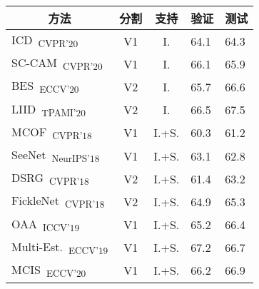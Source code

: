 \begin{table}[]
\normalsize
\centering
{\small
\begin{tabular}{@{}lccll@{}}
\toprule
\multicolumn{1}{c}{方法}                                                              & 分割      & 支持  & \multicolumn{1}{c}{验证} & \multicolumn{1}{c}{测试} \\ \midrule
\multicolumn{1}{l}{ICD~\cite{fan2020learning}\textsubscript{CVPR'20}}                   & V1        & I.    & 64.1                    & 64.3                     \\ 
\multicolumn{1}{l}{SC-CAM~\cite{chang2020weakly}\textsubscript{CVPR'20}}                & V1        & I.    & 66.1                    & 65.9                     \\
\multicolumn{1}{l}{BES~\cite{chen2020boundary}\textsubscript{ECCV'20}}                  & V2        & I.    & 65.7                    & 66.6                     \\
\multicolumn{1}{l}{LIID~\cite{liu2020leveraging}\textsubscript{TPAMI'20}}                  & V2        & I.    & 66.5                    & 67.5                     \\
\multicolumn{1}{l}{MCOF~\cite{wang2018weakly}\textsubscript{CVPR'18}}                   & V1        & I.+S. & 60.3                    & 61.2                     \\
\multicolumn{1}{l}{SeeNet~\cite{hou2018self}\textsubscript{NeurIPS'18}}                 & V1        & I.+S. & 63.1                    & 62.8                     \\
\multicolumn{1}{l}{DSRG~\cite{huang2018weakly}\textsubscript{CVPR'18}}                  & V2        & I.+S. & 61.4                    & 63.2                     \\
\multicolumn{1}{l}{FickleNet~\cite{lee2019ficklenet}\textsubscript{CVPR'18}}            & V2        & I.+S. & 64.9                    & 65.3                     \\
\multicolumn{1}{l}{OAA~\cite{jiang2019integral}\textsubscript{ICCV'19}}                 & V1        & I.+S. & 65.2                    & 66.4                     \\
\multicolumn{1}{l}{Multi-Est.~\cite{fan2020employing}\textsubscript{ECCV'19}}           & V1        & I.+S. & 67.2                    & 66.7                     \\
\multicolumn{1}{l}{MCIS~\cite{sun2020mining}\textsubscript{ECCV'20}}                    & V1        & I.+S. & 66.2                    & 66.9                     \\

\end{tabular}}
\end{table}
